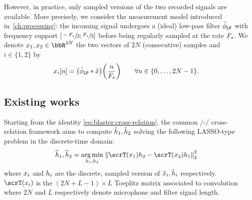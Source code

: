 However, in practice, only sampled versions of the two recorded signals are available.
More precisely, we consider the measurement model introduced in~\cref{ch:processing}:
the incoming signal undergoes a (ideal) low-pass filter $\lowpassfilter$ with frequency support $\kintervcc{\sfrac{-\Fs}{2}}{\sfrac{\Fs}{2}}$ before being regularly sampled at the rate $F_s$.
We denote $\disRecordedSignal_1,\disRecordedSignal_2\in\bbR^{2N}$ the two vectors of $2N$ (consecutive) samples and $i\in\{1, 2\}$ by
\begin{equation}
    \label{eq:blaster:measurement-process}
    \disRecordedSignal_i[n] =
    \kparen{\idealLowPassFilter \convDis \contRecordedSignal}\kparen{\frac{n}{\Fs}}
    \qquad
    \forall n \in\{0, \dots, 2N-1\}
    .
\end{equation}






\subsection{Existing works}\label{subsec:blaster:sota}
Starting from the identity \cref{eq:blaster:cross-relation}, the common \SIMO/-\BCE/ cross-relation framework aims to compute $\tilde{h}_1, \tilde{h}_2$ solving the following LASSO-type problem in the discrete-time domain:
\begin{equation}
    \label{eq:blaster:xrel_toepl}
    \disFilterHat_1, \disFilterHat_2
    =
    \kargmin_{\disFilter_1, \disFilter_2}
    \;
    \kvvbar{
        \scrT(\disRecordedSignal_1) \disFilter_2
        -
        \scrT(\disRecordedSignal_2) \disFilter_1
    }_2^2
\end{equation}
where $x_i$ and $h_i$ are the discrete, sampled version of $\tilde{x}_i, \tilde{h}_i$ respectively.
\\$\scrT(\disRecordedSignal_i)$ is the $(2N+L-1) \times L$ Toeplitz matrix
associated to convolution where $2N$ and $L$ respectively denote  microphone and filter signal length.

